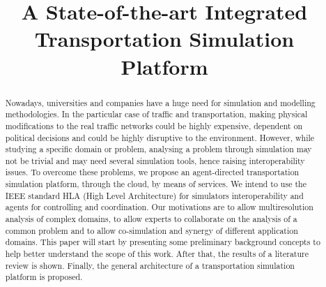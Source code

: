 \documentclass[conference]{IEEEtran}
\begin{document}
\pagestyle{plain}

\title{A State-of-the-art Integrated Transportation Simulation Platform\vspace{-2ex}}

\author{
}


\maketitle

\thispagestyle{plain}


\begin{abstract}
Nowadays, universities and companies have a huge need for simulation and modelling methodologies. In the particular case of traffic and transportation, making physical modifications to the real traffic networks could be highly expensive, dependent on political decisions and could be highly disruptive to the environment. 
However, while studying a specific domain or problem, analysing a problem through simulation may not be trivial and may need several simulation tools, hence raising interoperability issues.
To overcome these problems, we propose an agent-directed transportation simulation platform, through the cloud, by means of services. We intend to use the IEEE standard HLA (High Level Architecture) for simulators interoperability and agents for controlling and coordination. Our motivations are to allow multiresolution analysis of complex domains, to allow experts to collaborate on the analysis of a common problem and to allow co-simulation and synergy of different application domains.
This paper will start by presenting some preliminary background concepts to help better understand the scope of this work. After that, the results of a literature review is shown. Finally, the general architecture of a transportation simulation platform is proposed.
\end{abstract}
\end{document}
